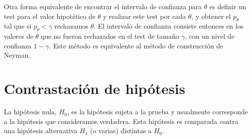



Otra forma equivalente de encontrar el intervalo de confianza para $\theta$ es definir un test para el
valor hipotético de $\theta$ y realizar este test por cada $\theta$, y obtener el {\pvalue}
$p_\theta$ tal que si $p_\theta < \gamma$ rechazamos $\theta$. El intervalo de confianza
consiste entonces en los valores de $\theta$ que no fueron rechazados en el test de tamaño $\gamma$,
con un nivel de confianza $1-\gamma$. Este método es equivalente al método de construcción
de Neyman.


\section{Contrastaci\'on de hipótesis} %

La hipótesis nula, $H_0$, es la hipótesis sujeta a la prueba y usualmente corresponde
a la hipótesis que consideramos verdadera.
Esta hipótesis es comparada contra una hipótesis alternativa $H_1$ (o varias) distintas a $H_0$.

